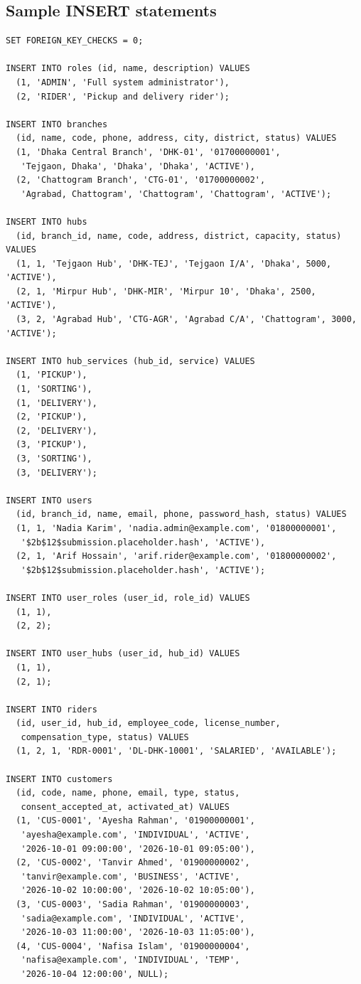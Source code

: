 \documentclass[11pt,a4paper]{article}
\begin{document}
\subsection{Sample INSERT statements}
\begin{lstlisting}
SET FOREIGN_KEY_CHECKS = 0;

INSERT INTO roles (id, name, description) VALUES
  (1, 'ADMIN', 'Full system administrator'),
  (2, 'RIDER', 'Pickup and delivery rider');

INSERT INTO branches
  (id, name, code, phone, address, city, district, status) VALUES
  (1, 'Dhaka Central Branch', 'DHK-01', '01700000001',
   'Tejgaon, Dhaka', 'Dhaka', 'Dhaka', 'ACTIVE'),
  (2, 'Chattogram Branch', 'CTG-01', '01700000002',
   'Agrabad, Chattogram', 'Chattogram', 'Chattogram', 'ACTIVE');

INSERT INTO hubs
  (id, branch_id, name, code, address, district, capacity, status) VALUES
  (1, 1, 'Tejgaon Hub', 'DHK-TEJ', 'Tejgaon I/A', 'Dhaka', 5000, 'ACTIVE'),
  (2, 1, 'Mirpur Hub', 'DHK-MIR', 'Mirpur 10', 'Dhaka', 2500, 'ACTIVE'),
  (3, 2, 'Agrabad Hub', 'CTG-AGR', 'Agrabad C/A', 'Chattogram', 3000, 'ACTIVE');

INSERT INTO hub_services (hub_id, service) VALUES
  (1, 'PICKUP'),
  (1, 'SORTING'),
  (1, 'DELIVERY'),
  (2, 'PICKUP'),
  (2, 'DELIVERY'),
  (3, 'PICKUP'),
  (3, 'SORTING'),
  (3, 'DELIVERY');

INSERT INTO users
  (id, branch_id, name, email, phone, password_hash, status) VALUES
  (1, 1, 'Nadia Karim', 'nadia.admin@example.com', '01800000001',
   '$2b$12$submission.placeholder.hash', 'ACTIVE'),
  (2, 1, 'Arif Hossain', 'arif.rider@example.com', '01800000002',
   '$2b$12$submission.placeholder.hash', 'ACTIVE');

INSERT INTO user_roles (user_id, role_id) VALUES
  (1, 1),
  (2, 2);

INSERT INTO user_hubs (user_id, hub_id) VALUES
  (1, 1),
  (2, 1);

INSERT INTO riders
  (id, user_id, hub_id, employee_code, license_number,
   compensation_type, status) VALUES
  (1, 2, 1, 'RDR-0001', 'DL-DHK-10001', 'SALARIED', 'AVAILABLE');

INSERT INTO customers
  (id, code, name, phone, email, type, status,
   consent_accepted_at, activated_at) VALUES
  (1, 'CUS-0001', 'Ayesha Rahman', '01900000001',
   'ayesha@example.com', 'INDIVIDUAL', 'ACTIVE',
   '2026-10-01 09:00:00', '2026-10-01 09:05:00'),
  (2, 'CUS-0002', 'Tanvir Ahmed', '01900000002',
   'tanvir@example.com', 'BUSINESS', 'ACTIVE',
   '2026-10-02 10:00:00', '2026-10-02 10:05:00'),
  (3, 'CUS-0003', 'Sadia Rahman', '01900000003',
   'sadia@example.com', 'INDIVIDUAL', 'ACTIVE',
   '2026-10-03 11:00:00', '2026-10-03 11:05:00'),
  (4, 'CUS-0004', 'Nafisa Islam', '01900000004',
   'nafisa@example.com', 'INDIVIDUAL', 'TEMP',
   '2026-10-04 12:00:00', NULL);


\end{lstlisting}
\end{document}
